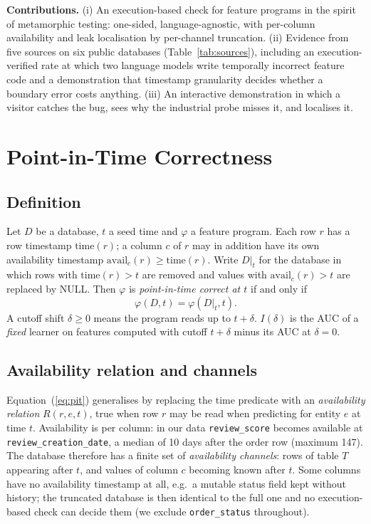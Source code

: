 \documentclass[conference]{IEEEtran}
\begin{document}
\textbf{Contributions.} (i) An execution-based check for feature programs in the spirit
of metamorphic testing: one-sided, language-agnostic, with per-column availability and
leak localisation by per-channel truncation.
(ii) Evidence from five sources on six public databases (Table~\ref{tab:sources}),
including an execution-verified rate at which two language models write temporally
incorrect feature code and a demonstration that timestamp granularity decides whether
a boundary error costs anything. (iii) An interactive demonstration in
which a visitor catches the bug, sees why the industrial probe misses it, and localises it.

\section{Point-in-Time Correctness}

\subsection{Definition}
Let $D$ be a database, $t$ a seed time and $\varphi$ a feature program. Each row $r$ has
a row timestamp $\mathrm{time}(r)$; a column $c$ of $r$ may in addition have its own
availability timestamp $\mathrm{avail}_c(r)\ge\mathrm{time}(r)$. Write $D|_t$ for the
database in which rows with $\mathrm{time}(r)>t$ are removed and values with
$\mathrm{avail}_c(r)>t$ are replaced by NULL. Then $\varphi$ is \emph{point-in-time
correct at $t$} if and only if
\begin{equation}
\varphi(D,t)=\varphi(D|_t,t).
\label{eq:pit}
\end{equation}
A cutoff shift $\delta\ge 0$ means the program reads up to $t+\delta$. $I(\delta)$ is the AUC of a \emph{fixed} learner on features
computed with cutoff $t+\delta$ minus its AUC at $\delta=0$.

\subsection{Availability relation and channels}
Equation~(\ref{eq:pit}) generalises by replacing the time predicate with an
\emph{availability relation} $R(r,e,t)$, true when row $r$ may be read when predicting
for entity $e$ at time $t$. Availability is per column: in our data \texttt{review\_score} becomes
available at \texttt{review\_creation\_date}, a median of 10 days after the order row (maximum 147). The database therefore has a finite set of
\emph{availability channels}: rows of table $T$ appearing after $t$, and values of
column $c$ becoming known after $t$. Some columns have no availability
timestamp at all, e.g.\ a mutable status field kept without history; the truncated
database is then identical to the full one and no execution-based check can decide them
(we exclude \texttt{order\_status} throughout).
\end{document}
